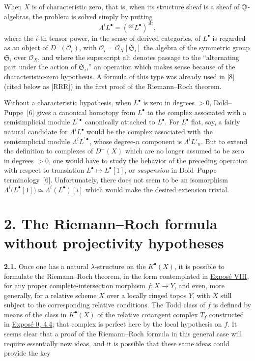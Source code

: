 When $X$ is of characteristic zero, that is, when its structure sheaf is a sheaf of $\mathbb Q$-algebras, the problem is solved simply by putting
\begin{equation}\tag{1.2}
  \Lambda^iL^\bullet
  =\left({}^{\otimes i}L^\bullet\right)^{\mathrm{alt}},
\end{equation}
where the $i$-th tensor power, in the sense of derived categories, of
$L^\bullet$ is regarded as an object of $D^-(\mathcal O_i)$, with
$\mathcal O_i=\mathcal O_X[\mathfrak S_i]$ the algebra of the symmetric
group $\mathfrak S_i$ over $\mathcal O_X$, and where the superscript
\(\mathrm{alt}\) denotes passage to the ``alternating part under the
action of $\mathfrak S_i$,'' an operation which makes sense because of
the characteristic-zero hypothesis. A formula of this type was already
used in [8] (cited below as [RRR]) in the first proof of the
Riemann--Roch theorem.

Without a characteristic hypothesis, when $L^\bullet$ is zero in degrees $>0$, Dold--Puppe~[6] gives a canonical homotopy from $L^\bullet$ to the complex associated with a semisimplicial module $L^{\prime\bullet}$ canonically attached to $L^\bullet$. For $L^\bullet$ flat, say, a fairly natural candidate for $\Lambda^iL^\bullet$ would be the complex associated with the semisimplicial module $\Lambda^iL^{\prime\bullet}$, whose degree-$n$ component is $\Lambda^iL'_n$. But to extend the definition to complexes of $D^-(X)$ which are no longer assumed to be zero in degrees $>0$, one would have to study the behavior of the preceding operation with respect to translation $L^\bullet\mapsto L^\bullet[1]$, or \emph{suspension} in Dold--Puppe terminology~[6]. Unfortunately, there does not seem to be an isomorphism $\Lambda^i\bigl(L^\bullet[1]\bigr)\simeq\Lambda^i(L^\bullet)[i]$ which would make the desired extension trivial.

\section*{2. The Riemann--Roch formula without projectivity hypotheses}

\textbf{2.1.} Once one has a natural $\lambda$-structure on the $K^\bullet(X)$, it is possible to formulate the Riemann--Roch theorem, in the form contemplated in \hyperlink{sga6.e08.expose}{Expos\'e VIII}, for any proper complete-intersection morphism $f:X\to Y$, and even, more generally, for a relative scheme $X$ over a locally ringed topos $Y$, with $X$ still subject to the corresponding relative conditions. The Todd class of $f$ is defined by means of the class in $K^\bullet(X)$ of the relative cotangent complex $T_f$ constructed in \hyperlink{sga6.e00.sec.4.4}{Expos\'e 0, 4.4}; that complex is perfect here by the local hypothesis on $f$. It seems clear that a proof of the Riemann--Roch formula in this general case will require essentially new ideas, and it is possible that these same ideas could provide the key

